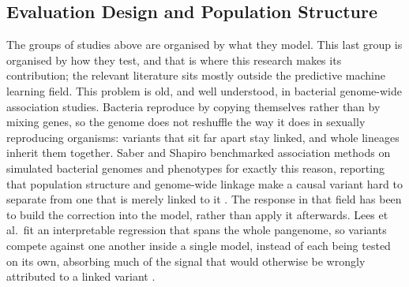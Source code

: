 \subsection{Evaluation Design and Population Structure}
\label{subsec:evaldesign}

The groups of studies above are organised by what they model. This last group is organised by how they test, and that is where this research makes its contribution; the relevant literature sits mostly outside the predictive machine learning field. This problem is old, and well understood, in bacterial genome-wide association studies. Bacteria reproduce by copying themselves rather than by mixing genes, so the genome does not reshuffle the way it does in sexually reproducing organisms: variants that sit far apart stay linked, and whole lineages inherit them together. Saber and Shapiro benchmarked association methods on simulated bacterial genomes and phenotypes for exactly this reason, reporting that population structure and genome-wide linkage make a causal variant hard to separate from one that is merely linked to it \cite{saber2020bacgwas}. The response in that field has been to build the correction into the model, rather than apply it afterwards. Lees et al.\ fit an interpretable regression that spans the whole pangenome, so variants compete against one another inside a single model, instead of each being tested on its own, absorbing much of the signal that would otherwise be wrongly attributed to a linked variant \cite{lees2020pyseer}.

\vspace{1em}

